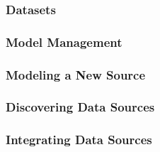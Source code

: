 \documentclass[runningheads,a4paper]{llncs}
\begin{document}
\subsubsection*{Datasets}


\subsubsection*{Model Management} 


\subsubsection*{Modeling a New Source} 


\subsubsection*{Discovering Data Sources} 


\subsubsection*{Integrating Data Sources} 




\end{document}
